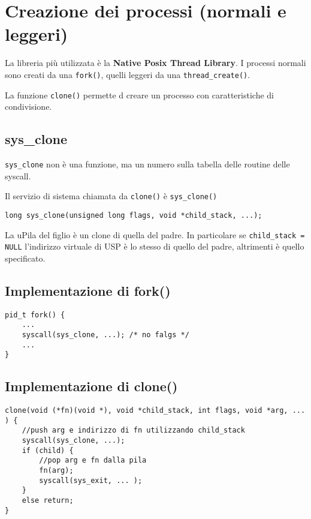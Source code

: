\documentclass[12pt, a4paper]{report}
\begin{document}
\section{Creazione dei processi (normali e leggeri)}
La libreria più utilizzata è la \textbf{Native Posix Thread Library}.
I processi normali sono creati da una \texttt{fork()}, quelli leggeri da una
\texttt{thread\_create()}.

La funzione  \texttt{clone()} permette d creare un processo con caratteristiche
di condivisione.

\subsection{sys\_clone}
\texttt{sys\_clone} non è una funzione, ma un numero sulla tabella delle
routine delle syscall.

Il servizio di sistema chiamata da \texttt{clone()} è \texttt{sys\_clone()}
\begin{verbatim}
long sys_clone(unsigned long flags, void *child_stack, ...);
\end{verbatim}
La uPila del figlio è un clone di quella del padre. In particolare se
\texttt{child\_stack = NULL} l'indirizzo virtuale di USP è lo stesso di quello
del padre, altrimenti è quello specificato.

\subsection{Implementazione di fork()}
\begin{verbatim}
pid_t fork() {
    ...
    syscall(sys_clone, ...); /* no falgs */
    ...
}
\end{verbatim}

\subsection{Implementazione di clone()}
\begin{verbatim}
clone(void (*fn)(void *), void *child_stack, int flags, void *arg, ... ) {
    //push arg e indirizzo di fn utilizzando child_stack
    syscall(sys_clone, ...);
    if (child) {
        //pop arg e fn dalla pila
        fn(arg);
        syscall(sys_exit, ... );
    }
    else return;
}
\end{verbatim}
\end{document}
